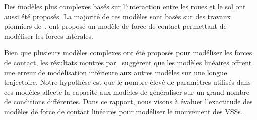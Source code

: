 Des modèles plus complexes basés sur l'interaction entre les roues et le sol ont aussi été proposés.
La majorité de ces modèles sont basés sur des travaux pionniers de~\citet{Wong1967}.
\citet{Ishigami2007} ont proposé un modèle de force de contact permettant de modéliser les forces latérales. 

Bien que plusieurs modèles complexes ont été proposés pour modéliser les forces de contact, les résultats montrés par~\citet{Seegmiller2016} suggèrent que les modèles linéaires offrent une erreur de modélisation inférieure aux autres modèles sur une longue trajectoire.
Notre hypothèse est que le nombre élevé de paramètres utilisés dans ces modèles affecte la capacité aux modèles de généraliser sur un grand nombre de conditions différentes.
Dans ce rapport, nous visons à évaluer l'exactitude des modèles de force de contact linéaires pour modéliser le mouvement des \acp{VSS}.
